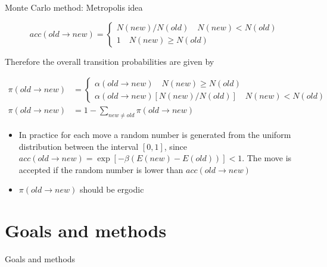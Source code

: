\documentclass{beamer}
\begin{document}
\begin{frame}{Monte Carlo method: Metropolis idea \cite{frenkel2001understanding}}

\begin{equation*}
acc(old \rightarrow new) = \begin{cases} N(new)/N(old)\quad N(new) < N(old) \\
1 \quad N(new) \geq N(old)  \end{cases}
\end{equation*}
\begin{itemize}
Therefore the overall transition probabilities are given by 
\end{itemize}
\begin{equation*}
\begin{split}
\pi(old \rightarrow new) &= \begin{cases} \alpha(old \rightarrow new)\quad N(new) \geq N(old) \\
\alpha(old \rightarrow new)  \left[  N(new)/N(old) \right] \quad N(new) < N(old) \end{cases} \\
\pi(old \rightarrow new) & = 1-\sum_{new\neq old} \pi(old\rightarrow new)
\end{split}
\end{equation*}
\begin{itemize}
\item In practice for each move a random number is generated from the uniform distribution between the interval $[0,1]$, since $acc(old \rightarrow new) = \exp\left[ -\beta \left( E(new)-E(old) \right)\right] < 1 $. The move is accepted if the random number is lower than $acc(old \rightarrow new)$
\item $\pi(old \rightarrow new)$ should be ergodic
\end{itemize}


\end{frame}






\section{Goals and methods}

\begin{frame}
\begin{center}
{\Huge Goals and methods}
\end{center}
\end{frame}
\end{document}
